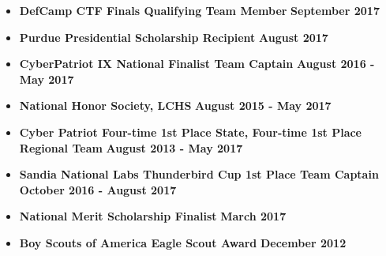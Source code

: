 \documentclass[letterpaper,10pt]{article}
\begin{document}
\begin{flushleft}
\begin{itemize}
		\item \textbf{DefCamp CTF Finals Qualifying Team Member} \hfill \textbf{September 2017} \\
		\item \textbf{Purdue Presidential Scholarship Recipient} \hfill \textbf{August 2017} \\
		\item \textbf{CyberPatriot IX National Finalist Team Captain} \hfill \textbf{August 2016 - May 2017} \\
		\item \textbf{National Honor Society, LCHS} \hfill \textbf{August 2015 - May 2017} \\
		\item \textbf{Cyber Patriot Four-time 1st Place State, Four-time 1st Place Regional Team} \hfill \textbf{August 2013 - May 2017} \\
		\item \textbf{Sandia National Labs Thunderbird Cup 1st Place Team Captain} \hfill \textbf{October 2016 - August 2017} \\
		\item \textbf{National Merit Scholarship Finalist} \hfill \textbf{March 2017} \\
		\item \textbf{Boy Scouts of America Eagle Scout Award} \hfill \textbf{December 2012}
	\end{itemize}
\end{flushleft}
\end{document}
